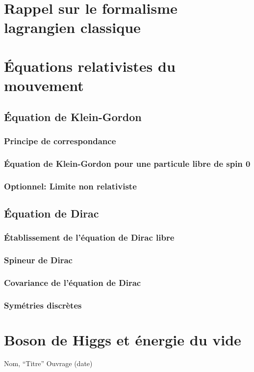 \documentclass{article}
\begin{document}
		
		\begin{appendices}
			\section{Rappel sur le formalisme lagrangien classique}
				\section{Équations relativistes du mouvement}
				
				\subsection{Équation de Klein-Gordon}
				\subsubsection{Principe de correspondance}
				\subsubsection{Équation de Klein-Gordon pour une particule libre de spin 0}
				\subsubsection{Optionnel: Limite non relativiste}
				\subsection{Équation de Dirac}
				\subsubsection{Établissement de l'équation de Dirac libre}
				\subsubsection{Spineur de Dirac}
				\subsubsection{Covariance de l'équation de Dirac}
				\subsubsection{Symétries discrètes}
			\section{Boson de Higgs et énergie du vide}
		\end{appendices}
		
		\begin{thebibliography}{4}
			Nom,
			``Titre''
			Ouvrage (date) 
			

			\end{thebibliography}
	
\end{document}
